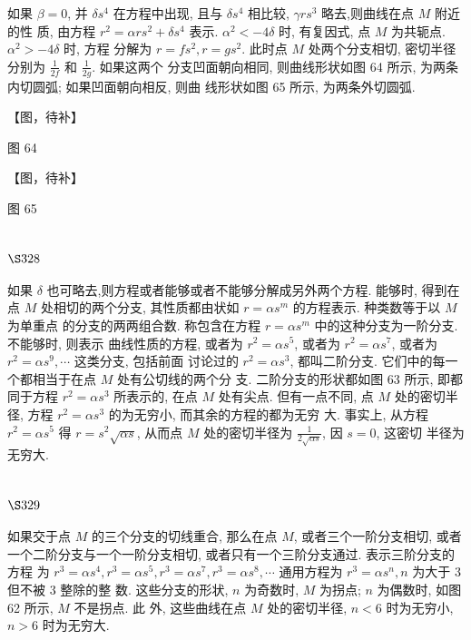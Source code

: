 如果 $\beta=0$, 并 $\delta s^{4}$ 在方程中出现, 且与 $\delta s^{4}$ 相比较, $\gamma r s^{3}$ 略去,则曲线在点 $M$ 附近的性 质, 由方程 $r^{2}=\alpha r s^{2}+\delta s^{4}$ 表示. $\alpha^{2}<-4 \delta$ 时, 有复因式, 点 $M$ 为共轭点. $\alpha^{2}>-4 \delta$ 时, 方程 分解为 $r=f s^{2}, r=g s^{2}$. 此时点 $M$ 处两个分支相切, 密切半径分别为 $\frac{1}{2 f}$ 和 $\frac{1}{2 g}$. 如果这两个 分支凹面朝向相同, 则曲线形状如图 64 所示, 为两条内切圆弧; 如果凹面朝向相反, 则曲 线形状如图 65 所示, 为两条外切圆弧.


【图，待补】

图 64


【图，待补】

图 65

\section{$\S 328$}

如果 $\delta$ 也可略去,则方程或者能够或者不能够分解成另外两个方程. 能够时, 得到在 点 $M$ 处相切的两个分支, 其性质都由状如 $r=\alpha s^{m}$ 的方程表示. 种类数等于以 $M$ 为单重点 的分支的两两组合数. 称包含在方程 $r=\alpha s^{m}$ 中的这种分支为一阶分支. 不能够时, 则表示 曲线性质的方程, 或者为 $r^{2}=\alpha s^{5}$, 或者为 $r^{2}=\alpha s^{7}$, 或者为 $r^{2}=\alpha s^{9}, \cdots$ 这类分支, 包括前面 讨论过的 $r^{2}=\alpha s^{3}$, 都叫二阶分支. 它们中的每一个都相当于在点 $M$ 处有公切线的两个分 支. 二阶分支的形状都如图 63 所示, 即都同于方程 $r^{2}=\alpha s^{3}$ 所表示的, 在点 $M$ 处有尖点. 但有一点不同, 点 $M$ 处的密切半径, 方程 $r^{2}=\alpha s^{3}$ 的为无穷小, 而其余的方程的都为无穷 大. 事实上, 从方程 $r^{2}=\alpha s^{5}$ 得 $r=s^{2} \sqrt{\alpha s}$, 从而点 $M$ 处的密切半径为 $\frac{1}{2 \sqrt{\alpha s}}$, 因 $s=0$, 这密切 半径为无穷大.

\section{$\S 329$}

如果交于点 $M$ 的三个分支的切线重合, 那么在点 $M$, 或者三个一阶分支相切, 或者 一个二阶分支与一个一阶分支相切, 或者只有一个三阶分支通过. 表示三阶分支的方程 为 $r^{3}=\alpha s^{4}, r^{3}=\alpha s^{5}, r^{3}=\alpha s^{7}, r^{3}=\alpha s^{8}, \cdots$ 通用方程为 $r^{3}=\alpha s^{n}, n$ 为大于 3 但不被 3 整除的整 数. 这些分支的形状, $n$ 为奇数时, $M$ 为拐点; $n$ 为偶数时, 如图 62 所示, $M$ 不是拐点. 此 外, 这些曲线在点 $M$ 处的密切半径, $n<6$ 时为无穷小, $n>6$ 时为无穷大. 


